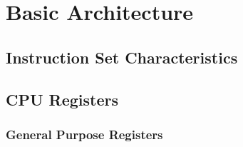 \chapter{Basic Architecture}

\section{Instruction Set Characteristics}


\section{CPU Registers}

\subsection{General Purpose Registers}

